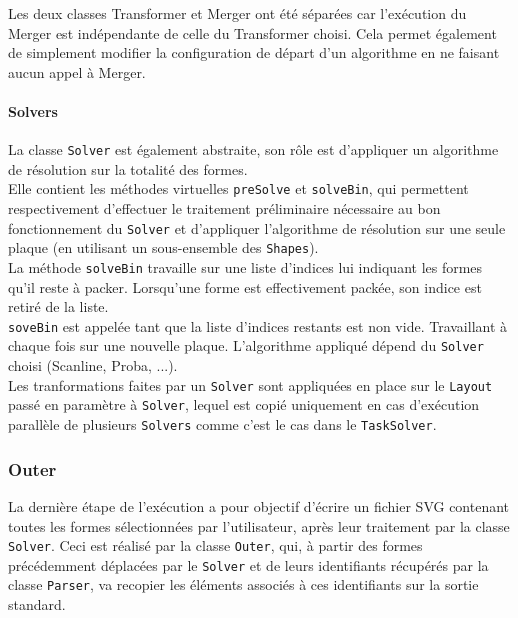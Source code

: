 Les deux classes Transformer et Merger ont été séparées car l'exécution du Merger est indépendante de celle du Transformer choisi. Cela permet également de simplement modifier la configuration de départ d'un algorithme en ne faisant aucun appel à Merger.


\paragraph{Solvers}

La classe \texttt{Solver} est également abstraite, son rôle est d'appliquer un algorithme de résolution sur la totalité des formes.\\
Elle contient les méthodes virtuelles \texttt{preSolve} et \texttt{solveBin}, qui permettent respectivement d'effectuer le traitement préliminaire nécessaire au bon fonctionnement du \texttt{Solver} et d'appliquer l'algorithme de résolution sur une seule plaque (en utilisant un sous-ensemble des \texttt{Shapes}).\\
La méthode \texttt{solveBin} travaille sur une liste d'indices lui indiquant les formes qu'il reste à packer. Lorsqu'une forme est effectivement packée, son indice est retiré de la liste.\\
\texttt{soveBin} est appelée tant que la liste d'indices restants est non vide. Travaillant à chaque fois sur une nouvelle plaque.  
L'algorithme appliqué dépend du \texttt{Solver} choisi (Scanline, Proba, ...).\\

Les tranformations faites par un \texttt{Solver} sont appliquées en place sur le \texttt{Layout} passé en paramètre à \texttt{Solver}, lequel est copié uniquement en cas d'exécution parallèle de plusieurs \texttt{Solvers} comme c'est le cas dans le \texttt{TaskSolver}.







\subsubsection{Outer}

La dernière étape de l'exécution a pour objectif d'écrire un fichier SVG contenant toutes les formes sélectionnées par l'utilisateur, après leur traitement par la classe \texttt{Solver}. Ceci est réalisé par la classe \texttt{Outer}, qui, à partir des formes précédemment déplacées par le \texttt{Solver} et de leurs identifiants récupérés par la classe \texttt{Parser}, va recopier les éléments associés à ces identifiants sur la sortie standard. \\

